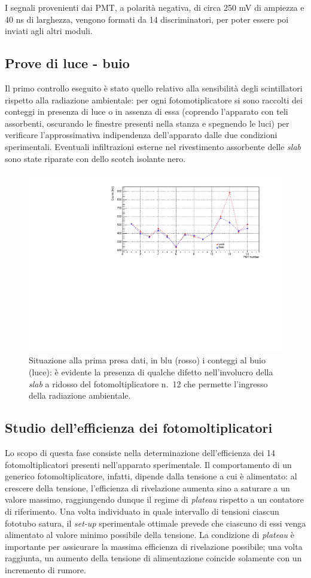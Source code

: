 \documentclass[10pt, oneside, a4paper]{article}   	%
\begin{document}
I segnali provenienti dai PMT, a polarità negativa, di circa 250 mV di ampiezza e 40 ns di larghezza, vengono formati da 14 discriminatori, per poter essere poi inviati agli altri moduli.
%
%
\subsection{Prove di luce - buio}
Il primo controllo eseguito è stato quello relativo alla sensibilità degli scintillatori rispetto alla radiazione ambientale: per ogni fotomotiplicatore si sono raccolti dei conteggi in presenza di luce o in assenza di essa (coprendo l'apparato con teli assorbenti, oscurando le finestre presenti nella stanza e spegnendo le luci) per verificare l'approssimativa indipendenza dell'apparato dalle due condizioni sperimentali. Eventuali infiltrazioni esterne nel rivestimento assorbente delle \emph{slab} sono state riparate con dello scotch isolante nero. 
%
\begin{figure}[h]
	\centering
	\includegraphics[scale=0.6]{img/luce_buio_100s.pdf}
	\caption{Situazione alla prima presa dati, in blu (rosso) i conteggi al buio (luce): è evidente la presenza di qualche difetto nell'involucro della \emph{slab} a ridosso del fotomoltiplicatore n.~12 che permette l'ingresso della radiazione ambientale.}
\end{figure}
%
\subsection{Studio dell'efficienza dei fotomoltiplicatori}
Lo scopo di questa fase consiste nella determinazione dell'efficienza dei 14 fotomoltiplicatori presenti nell'apparato sperimentale. Il comportamento di un generico fotomoltiplicatore, infatti, dipende dalla tensione a cui è alimentato: al crescere della tensione, l'efficienza di rivelazione aumenta sino a saturare a un valore massimo, raggiungendo dunque il regime di \textit{plateau} rispetto a un contatore di riferimento.
Una volta individuato in quale intervallo di tensioni ciascun fototubo satura, il \emph{set-up} sperimentale ottimale prevede che ciascuno di essi venga alimentato al valore minimo possibile della tensione. 
La condizione di \textit{plateau} è importante per assicurare la massima efficienza di rivelazione possibile; una volta raggiunta, un aumento della tensione di alimentazione coincide solamente con un incremento di rumore.  
\end{document}
